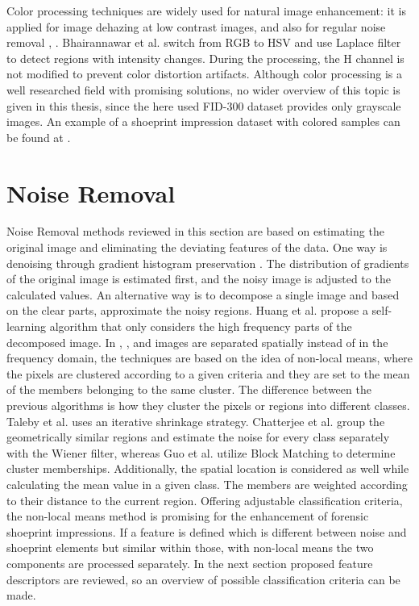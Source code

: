 \documentclass[draft,final]{vutinfth} %
\begin{document}
\par
Color processing techniques are widely used for natural image enhancement: it is applied for image dehazing at low contrast images, \cite{singh2018dehazing} and also for regular noise removal \cite{ren2018joint}, \cite{zhang2016simultaneous}. 
Bhairannawar et al. \cite{bhairannawar2017color} switch from RGB to HSV and use Laplace filter to detect regions with intensity changes. 
During the processing, the H channel is not modified to prevent color distortion artifacts.
Although color processing is a well researched field with promising solutions, no wider overview of this topic is given in this thesis, since the here used FID-300 dataset provides only grayscale images. 
An example of a shoeprint impression dataset with colored samples can be found at \cite{katireddy2017novel}. 

\section{Noise Removal}

Noise Removal methods reviewed in this section are based on estimating the original image and eliminating the deviating features of the data.
One way is denoising through gradient histogram preservation \cite{zuo2013texture}.
The distribution of gradients  of the original image is estimated first, and the noisy image is adjusted to the calculated values.
An alternative way is to decompose a single image and based on the clear parts, approximate the noisy regions.
Huang et al. \cite{huang2013self} propose a self-learning algorithm that only considers the high frequency parts of the decomposed image.
In \cite{xu2015patch}, \cite{talebi2013global}, \cite{chatterjee2011patch} and \cite{guo2015efficient} images  are separated spatially instead of in the frequency domain, the techniques are based on the idea of non-local means, where the pixels are clustered according to a given criteria and they are set to the mean of the members belonging to the same cluster.
The difference between the previous algorithms is how they cluster the pixels or regions into different classes.
Taleby et al. \cite{talebi2013global} uses an iterative shrinkage strategy. 
Chatterjee et al.  \cite{chatterjee2011patch} group the geometrically similar regions and estimate the noise for every class separately with the Wiener filter, whereas Guo et al. \cite{guo2015efficient} utilize Block Matching to determine cluster memberships. 
Additionally, the spatial location is considered as well while calculating the mean value in a given class.
The members are weighted according to their distance to the current region.
Offering adjustable classification criteria, the non-local means method is promising for the enhancement of forensic shoeprint impressions.
If a feature is defined which is different between noise and shoeprint elements but similar within those, with non-local means the two components are processed separately.
In the next section proposed feature descriptors are reviewed, so an overview of possible classification criteria can be made.
\end{document}
